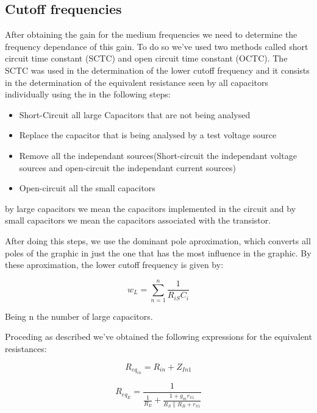 \subsection{Cutoff frequencies}

After obtaining the gain for the medium frequencies we need to determine the frequency dependance of this gain. To do so we've used two methods called short circuit time constant (SCTC) and open circuit time constant (OCTC). The SCTC was used in the determination of the lower cutoff frequency and it consists in the determination of the equivalent resistance seen by all capacitors individually using the in the following steps:

\begin{itemize}

\item Short-Circuit all large Capacitors that are not being analysed 
\item Replace the capacitor that is being analysed by a test voltage source
\item Remove all the independant sources(Short-circuit the independant voltage sources and open-circuit the independant current sources) 
\item Open-circuit all the small capacitors

\end{itemize}

by large capacitors we mean the capacitors implemented in the circuit and by small capacitors we mean the capacitors associated with the transistor.

After doing this steps, we use the dominant pole aproximation, which converts all poles of the graphic in just the one that has the most influence in the graphic. By these aproximation, the lower cutoff frequency is given by:

\begin{equation}
w_L = \sum_{n = 1}^n \frac{1}{R_{iS}C_i}
\label{wl}
\end{equation} 

Being n the number of large capacitors.

Proceding as described we've obtained the following expressions for the equivalent resistances:

\begin{equation}
R_{eq_{in}} = R_{in} + Z_{In1}
\end{equation} 

\begin{equation}
R_{eq_{E}} = \frac{1}{\frac{1}{R_E}+\frac{1+g_mr_{\pi 1}}{R_S \parallel R_B + r_{\pi 1}}}
\end{equation} 

